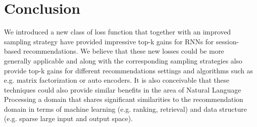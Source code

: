 \chapter{Conclusion}
We introduced a new class of loss function that together with an improved sampling strategy have provided impressive top-k gains for RNNs for session-based recommendations. We believe that these new losses could be more generally applicable and along with the corresponding sampling strategies also provide top-k gains for different recommendations settings and algorithms such as e.g. matrix factorization or auto encoders. It is also conceivable that these techniques could also provide similar benefits in the area of Natural Language Processing a domain that shares significant similarities to the recommendation domain in terms of machine learning (e.g. ranking, retrieval) and data structure (e.g. sparse large input and output space).
